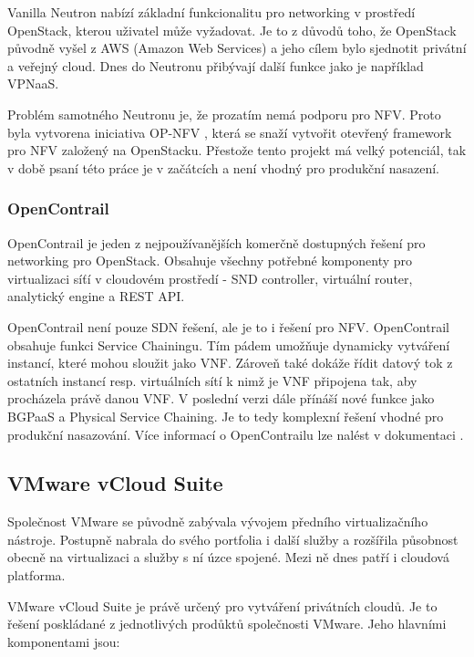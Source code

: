 Vanilla Neutron nabízí základní funkcionalitu pro networking v prostředí OpenStack, kterou uživatel může vyžadovat. Je to z důvodů toho, že OpenStack původně vyšel z AWS (Amazon Web Services) a jeho cílem bylo sjednotit privátní a veřejný cloud. Dnes do Neutronu přibývají další funkce jako je například VPNaaS.

Problém samotného Neutronu je, že prozatím nemá podporu pro NFV. Proto byla vytvorena iniciativa OP-NFV \cite{opnfv} , která se snaží vytvořit otevřený framework pro NFV založený na OpenStacku. Přestože tento projekt má velký potenciál, tak v době psaní této práce je v začátcích a není vhodný pro produkční nasazení.

\subsubsection{OpenContrail} 

OpenContrail je jeden z nejpoužívanějších komerčně dostupných řešení pro networking pro OpenStack. Obsahuje všechny potřebné komponenty pro virtualizaci síťí v cloudovém prostředí - SND controller, virtuální router, analytický engine a REST API. \cite{OpenContrail}

OpenContrail není pouze SDN řešení, ale je to i řešení pro NFV. OpenContrail obsahuje funkci Service Chainingu. Tím pádem umožňuje dynamicky vytváření instancí, které mohou sloužit jako VNF. Zároveň také dokáže řídit datový tok z ostatních instancí resp. virtuálních sítí k nimž je VNF připojena tak, aby procházela právě danou VNF. V poslední verzi dále přínáší nové funkce jako BGPaaS a Physical Service Chaining. Je to tedy komplexní řešení vhodné pro produkční nasazování. Více informací o OpenContrailu lze nalést v dokumentaci \cite{opencontrail_web}.

\subsection{VMware vCloud Suite}

Společnost VMware \cite{vmware_web} se původně zabývala vývojem předního virtualizačního nástroje. Postupně nabrala do svého portfolia i další služby a rozšířila působnost obecně na virtualizaci a služby s ní úzce spojené. Mezi ně dnes patří i cloudová platforma. 

VMware vCloud Suite je právě určený pro vytváření privátních cloudů. Je to řešení poskládané z jednotlivých prodůktů společnosti VMware. Jeho hlavními komponentami jsou:

